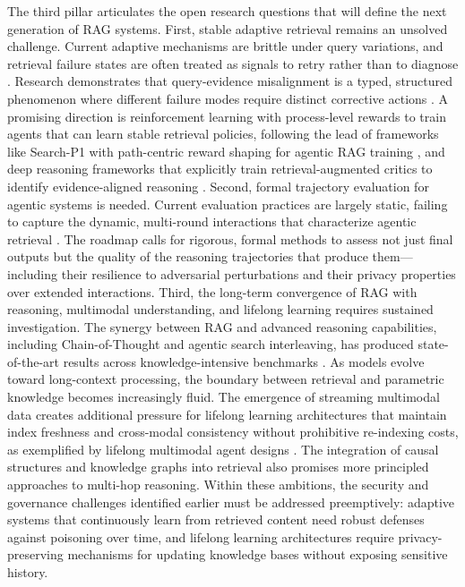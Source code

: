 \documentclass[11pt]{article}
\begin{document}
The third pillar articulates the open research questions that will define the next generation of RAG systems. First, stable adaptive retrieval remains an unsolved challenge. Current adaptive mechanisms are brittle under query variations, and retrieval failure states are often treated as signals to retry rather than to diagnose \cite{ref630}. Research demonstrates that query-evidence misalignment is a typed, structured phenomenon where different failure modes require distinct corrective actions \cite{ref630}. A promising direction is reinforcement learning with process-level rewards to train agents that can learn stable retrieval policies, following the lead of frameworks like Search-P1 with path-centric reward shaping for agentic RAG training \cite{ref266}, and deep reasoning frameworks that explicitly train retrieval-augmented critics to identify evidence-aligned reasoning \cite{ref631}. Second, formal trajectory evaluation for agentic systems is needed. Current evaluation practices are largely static, failing to capture the dynamic, multi-round interactions that characterize agentic retrieval \cite{ref25}. The roadmap calls for rigorous, formal methods to assess not just final outputs but the quality of the reasoning trajectories that produce them---including their resilience to adversarial perturbations and their privacy properties over extended interactions. Third, the long-term convergence of RAG with reasoning, multimodal understanding, and lifelong learning requires sustained investigation. The synergy between RAG and advanced reasoning capabilities, including Chain-of-Thought and agentic search interleaving, has produced state-of-the-art results across knowledge-intensive benchmarks \cite{ref21}. As models evolve toward long-context processing, the boundary between retrieval and parametric knowledge becomes increasingly fluid. The emergence of streaming multimodal data creates additional pressure for lifelong learning architectures that maintain index freshness and cross-modal consistency without prohibitive re-indexing costs, as exemplified by lifelong multimodal agent designs \cite{ref632}. The integration of causal structures and knowledge graphs into retrieval also promises more principled approaches to multi-hop reasoning. Within these ambitions, the security and governance challenges identified earlier must be addressed preemptively: adaptive systems that continuously learn from retrieved content need robust defenses against poisoning over time, and lifelong learning architectures require privacy-preserving mechanisms for updating knowledge bases without exposing sensitive history.
\end{document}
